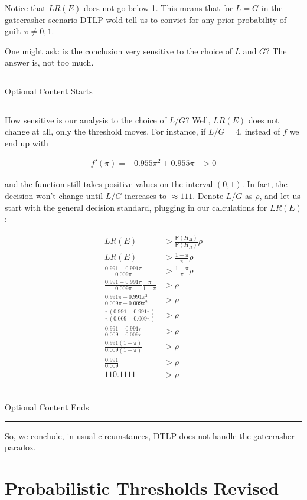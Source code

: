 \documentclass[10pt,dvipsnames,enabledeprecatedfontcommands]{scrartcl}
\newcommand{\pr}[1]{\mathsf{P}(#1)}
\newcommand{\intermezzoa}{
	\begin{minipage}[c]{13cm}
	\begin{center}\rule{10cm}{0.4pt}



	\tiny{\sc Optional Content Starts}
	
	\vspace{-1mm}
	
	\rule{10cm}{0.4pt}\end{center}
	\end{minipage}\nopagebreak 
	}
\newcommand{\intermezzob}{\nopagebreak 
	\begin{minipage}[c]{13cm}
	\begin{center}\rule{10cm}{0.4pt}

	\tiny{\sc Optional Content Ends}
	
	\vspace{-1mm}
	
	\rule{10cm}{0.4pt}\end{center}
	\end{minipage}
	}
\begin{document}
\noindent Notice that \(LR(E)\) does not go below 1. This means that for
\(L=G\) in the gatecrasher scenario DTLP wold tell us to convict for any
prior probability of guilt \(\pi\neq 0,1\).

One might ask: is the conclusion very sensitive to the choice of \(L\)
and \(G\)? The answer is, not too much.

\intermezzoa

How sensitive is our analysis to the choice of \(L/G\)? Well, \(LR(E)\)
does not change at all, only the threshold moves. For instance, if
\(L/G=4\), instead of \(f\) we end up with

\begin{align*}
 f'(\pi) = - 0.955 \pi^2 + 0.955\pi &>0 
 \end{align*}

and the function still takes positive values on the interval \((0,1)\).
In fact, the decision won't change until \(L/G\) increases to
\(\approx 111\). Denote \(L/G\) as \(\rho\), and let us start with the
general decision standard, plugging in our calculations for \(LR(E)\):

\begin{align*}
LR(E) &> \frac{\pr{H_\Delta}}{\pr{H_\Pi}} \rho\\
LR(E) &> \frac{1-\pi}{\pi} \rho \\
\frac{0.991-0.991\pi}{0.009\pi} &> \frac{1-\pi}{\pi} \rho\\
\frac{0.991-0.991\pi}{0.009\pi}\frac{\pi}{1-\pi} &>  \rho\\
\frac{0.991\pi-0.991\pi^2}{0.009\pi-0.009\pi^2} &>  \rho\\
\frac{\pi(0.991-0.991\pi)}{\pi(0.009-0.009\pi)} &>  \rho\\
\frac{0.991-0.991\pi}{0.009-0.009\pi} &>  \rho\\
\frac{0.991(1-\pi)}{0.009(1-\pi)} &>  \rho\\
\frac{0.991}{0.009} &>  \rho\\
110.1111 &>  \rho\\
\end{align*}

\intermezzob

So, we conclude, in usual circumstances, DTLP does not handle the
gatecrasher paradox.

\section{Probabilistic Thresholds
Revised}\label{probabilistic-thresholds-revised}
\end{document}
